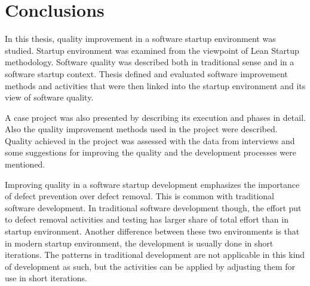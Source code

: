 
 \chapter{Conclusions}

 
 In this thesis, quality improvement in a software startup environment was studied. Startup environment was examined from the viewpoint of Lean Startup methodology. Software quality was described both in traditional sense and in a software startup context. Thesis defined and evaluated software improvement methods and activities that were then linked into the startup environment and its view of software quality.

 A case project was also presented by describing its execution and phases in detail. Also the quality improvement methods used in the project were described. Quality achieved in the project was assessed with the data from interviews and some suggestions for improving the quality and the development processes were mentioned.



Improving quality in a software startup development emphasizes the importance of defect prevention over defect removal. This is common with traditional software development. In traditional software development though, the effort put to defect removal activities and testing has larger share of total effort than in startup environment. Another difference between these two environments is that in modern startup environment, the development is usually done in short iterations. The patterns in traditional development are not applicable in this kind of development as such, but the activities can be applied by adjusting them for use in short iterations.

